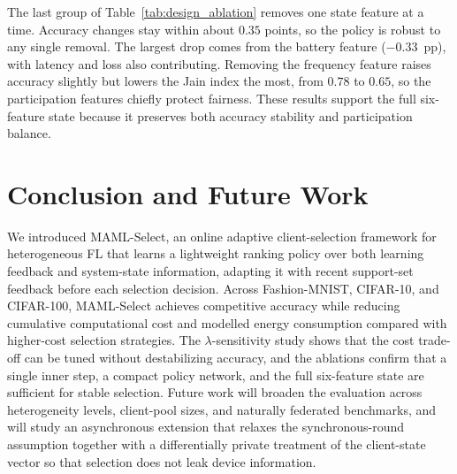 \documentclass[journal]{IEEEtran}
\theoremstyle{remark}
\newcommand{\revision}[1]{#1}
\begin{document}
\revision{The last group of Table~\ref{tab:design_ablation} removes one state feature at a time. Accuracy changes stay within about $0.35$ points, so the policy is robust to any single removal. The largest drop comes from the battery feature ($-0.33$~pp), with latency and loss also contributing. Removing the frequency feature raises accuracy slightly but lowers the Jain index the most, from $0.78$ to $0.65$, so the participation features chiefly protect fairness. These results support the full six-feature state because it preserves both accuracy stability and participation balance.}

\FloatBarrier
\section{Conclusion and Future Work}
\revision{We introduced MAML-Select, an online adaptive client-selection framework for heterogeneous FL that learns a lightweight ranking policy over both learning feedback and system-state information, adapting it with recent support-set feedback before each selection decision.
Across Fashion-MNIST, CIFAR-10, and CIFAR-100, MAML-Select achieves competitive accuracy while reducing cumulative computational cost and modelled energy consumption compared with higher-cost selection strategies. The $\lambda$-sensitivity study shows that the cost trade-off can be tuned without destabilizing accuracy, and the ablations confirm that a single inner step, a compact policy network, and the full six-feature state are sufficient for stable selection. Future work will broaden the evaluation across heterogeneity levels, client-pool sizes, and naturally federated benchmarks, and will study an asynchronous extension that relaxes the synchronous-round assumption together with a differentially private treatment of the client-state vector so that selection does not leak device information.}
\end{document}
